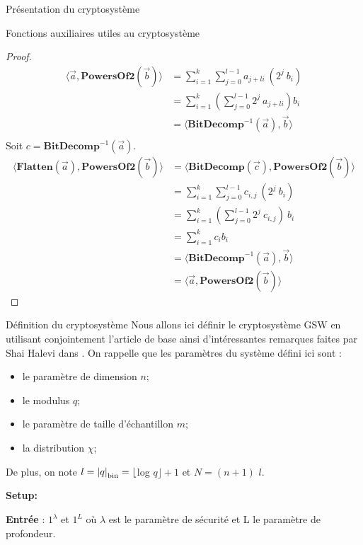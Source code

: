 \begin{section}{Présentation du cryptosystème}
\begin{subsection}{Fonctions auxiliaires utiles au cryptosystème}
	\begin{proof}
	\begin{align*}
	\langle \vec{a}, \textbf{PowersOf2}(\vec{b}) \rangle &= \sum\limits_{i=1}^{k} \sum\limits_{j=0}^{l-1} a_{j+li}
	\: (2^{j} \: b_i) \\
	&= \sum\limits_{i=1}^{k} \left(\sum\limits_{j=0}^{l-1} 2^j\: a_{j+li} \right) b_i \\
	&= \langle \textbf{BitDecomp}^{-1}(\vec{a}), \vec{b}\rangle \\
	\end{align*}
	Soit $c = \textbf{BitDecomp}^{-1}(\vec{a})$.
	\begin{align*}
	\langle \textbf{Flatten}(\vec{a}),\textbf{PowersOf2}(\vec{b}) \rangle &= \langle \textbf{BitDecomp}(\vec{c}),\textbf{PowersOf2}(\vec{b}) \rangle \\
	&= \sum\limits_{i=1}^{k} \sum\limits_{j=0}^{l-1} c_{i,j}\: (2^{j}\: b_i) \\
	&= \sum\limits_{i=1}^{k} \left(\sum\limits_{j=0}^{l-1} 2^j \: c_{i,j}\right)\: b_i \\
	&= \sum\limits_{i=1}^{k}  c_i b_i \\
	&= \langle \textbf{BitDecomp}^{-1}(\vec{a}), \vec{b}\rangle \\
	&= \langle \vec{a}, \textbf{PowersOf2}(\vec{b}) \rangle
	\end{align*}
	\end{proof}
	
	\end{subsection}
	\begin{subsection}{Définition du cryptosystème}
	Nous allons ici définir le cryptosystème GSW en utilisant conjointement l'article de base
	\cite{EPRINT:GenSahWat13} ainsi d'intéressantes remarques faites par Shai Halevi dans \cite{halevi}.
	On rappelle que les paramètres du système défini ici sont : 
\begin{itemize}
\item le paramètre de dimension $n$;
\item le modulus $q$;
\item le paramètre de taille d'échantillon $m$;
\item la distribution $\chi$;
\end{itemize}
De plus, on note $l = {|q|}_{\text{bin}} = \lfloor$log $q\rfloor + 1$ et $N = (n + 1)$ $l$.


\vspace{0.5cm}\noindent\textbf{Setup:}
\flushleft

	\textbf{Entrée} : $1^\lambda$ et $1^L$ où $\lambda$ est le paramètre de sécurité et L le paramètre de profondeur.


\end{subsection}
\end{section}
